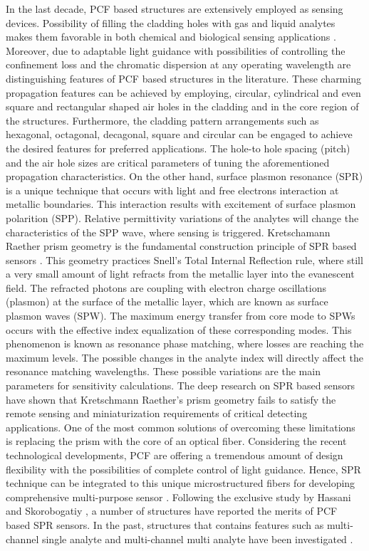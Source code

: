 \documentclass[journal]{IEEEtran}
\begin{document}
In the last decade, PCF based structures are extensively employed as sensing devices. Possibility of filling the cladding holes with gas and liquid analytes makes them favorable in both chemical and biological sensing applications  \cite{wang2011selectively,rifat2016highly,dash2014spr}. Moreover, due to adaptable light guidance with possibilities of controlling the confinement loss and the chromatic dispersion at any operating wavelength are distinguishing features of PCF based structures in the literature. These charming propagation features can be achieved by employing, circular, cylindrical and even square and rectangular shaped   air holes in the cladding and in the core region of the structures. Furthermore, the cladding pattern arrangements such as hexagonal, octagonal, decagonal, square and circular \cite{wang2011selectively,ademgil2014highly} can be engaged to achieve the desired features for preferred applications. The hole-to hole spacing (pitch) and the air hole sizes are critical parameters of tuning the aforementioned propagation characteristics. On the other hand, surface plasmon resonance (SPR) is a unique technique that occurs with light and free electrons interaction at metallic boundaries. This interaction results with excitement of surface plasmon polarition (SPP). Relative permittivity variations of the analytes will change the characteristics of the SPP wave, where sensing is triggered. Kretschamann Raether prism geometry is the fundamental construction principle of SPR based sensors  \cite{kretschmann1968radiative}. This geometry practices Snell's Total Internal Reflection rule, where still a very small amount of light refracts from the metallic layer into the evanescent field. The refracted photons are coupling with electron charge oscillations (plasmon) at the surface of the metallic layer, which are known as surface plasmon waves (SPW). The maximum energy transfer from core mode to SPWs occurs with the effective index equalization of these corresponding modes. This phenomenon is known as resonance phase matching, where losses are reaching the maximum levels. The possible changes in the analyte index will directly affect the resonance matching wavelengths. These possible variations are the main parameters for sensitivity calculations. The deep research on SPR based sensors have shown that Kretschmann Raether's prism geometry fails to satisfy the remote sensing and miniaturization requirements of critical detecting applications. One of the most common solutions of overcoming these limitations is replacing the prism with the core of an optical fiber. Considering the recent technological developments, PCF are offering a tremendous amount of design flexibility with the possibilities of complete control of light guidance. Hence, SPR technique can be integrated to this unique microstructured fibers for developing comprehensive multi-purpose sensor \cite{rifat2016highly,yasli2019effect}. Following the exclusive study by Hassani and Skorobogatiy \cite{hassani2006design}, a number of structures have reported the merits of PCF based SPR sensors. In the past, structures that contains features such as multi-channel single analyte and multi-channel multi analyte have been investigated \cite{rifat2016highly,yasli2019effect,yasli2019multi,azzam2016multichannel}. 
\end{document}
